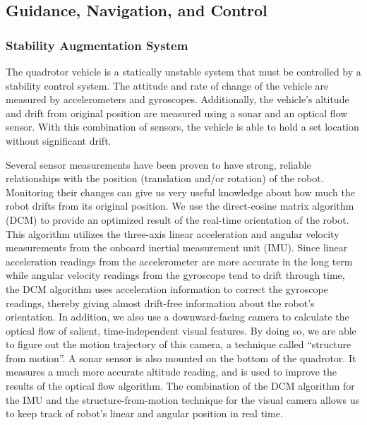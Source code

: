 \documentclass[12pt, letterpaper]{article}
\begin{document}
\subsection{Guidance, Navigation, and Control}
\subsubsection{Stability Augmentation System}

The quadrotor vehicle is a statically unstable system that must be controlled by a stability control system. The attitude and rate of change of the vehicle are measured by accelerometers and gyroscopes. Additionally, the vehicle's altitude and drift from original position are measured using a sonar and an optical flow sensor. With this combination of sensors, the vehicle is able to hold a set location without significant drift.

Several sensor measurements have been proven to have strong, reliable relationships with the position (translation and/or rotation) of the robot. Monitoring their changes can give us very useful knowledge about how much the robot drifts from its original position. We use the direct-cosine matrix algorithm (DCM) to provide an optimized result of the real-time orientation of the robot. This algorithm utilizes the three-axis linear acceleration and angular velocity measurements from the onboard inertial measurement unit (IMU). Since linear acceleration readings from the accelerometer are more accurate in the long term while angular velocity readings from the gyroscope tend to drift through time, the DCM algorithm uses acceleration information to correct the gyroscope readings, thereby giving almost drift-free information about the robot's orientation. In addition, we also use a downward-facing camera to calculate the optical flow of salient, time-independent visual features. By doing so, we are able to figure out the motion trajectory of this camera, a technique called ``structure from motion''. A sonar sensor is also mounted on the bottom of the quadrotor. It measures a much more accurate altitude reading, and is used to improve the results of the optical flow algorithm. The combination of the DCM algorithm for the IMU and the structure-from-motion technique for the visual camera allows us to keep track of robot's linear and angular position in real time.
\end{document}
